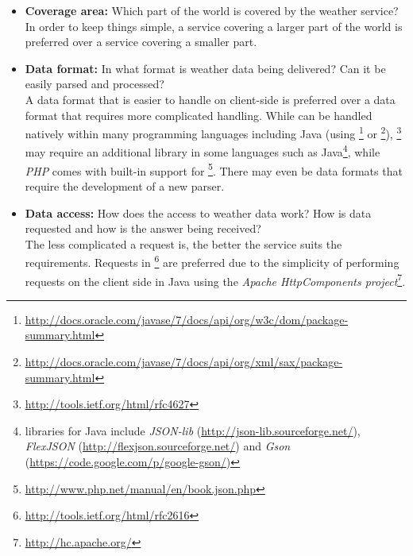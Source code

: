 \begin{itemize}
  \item \textbf{Coverage area:} Which part of the world is covered by the weather service?\\
  In order to keep things simple, a service covering a larger part of the world is preferred over a service covering a smaller part.
  
  \item \textbf{Data format:} In what format is weather data being delivered? Can it be easily parsed and processed?\\
  A data format that is easier to handle on client-side is preferred over a data format that requires more complicated handling. While \cite{XML} can be handled natively within many programming languages including Java (using \footnote{\href{http://docs.oracle.com/javase/7/docs/api/org/w3c/dom/package-summary.html}{http://docs.oracle.com/javase/7/docs/api/org/w3c/dom/package-summary.html}} or \footnote{\href{http://docs.oracle.com/javase/7/docs/api/org/xml/sax/package-summary.html}{http://docs.oracle.com/javase/7/docs/api/org/xml/sax/package-summary.html}}), \footnote{\href{http://tools.ietf.org/html/rfc4627}{http://tools.ietf.org/html/rfc4627}} may require an additional library in some languages such as Java\footnote{ libraries for Java include \emph{JSON-lib} (\href{http://json-lib.sourceforge.net/}{http://json-lib.sourceforge.net/}), \emph{FlexJSON} (\href{http://flexjson.sourceforge.net/}{http://flexjson.sourceforge.net/}) and \emph{Gson}
    (\href{https://code.google.com/p/google-gson/}{https://code.google.com/p/google-gson/})}, while \emph{PHP} comes with built-in support for \footnote{\href{http://www.php.net/manual/en/book.json.php}{http://www.php.net/manual/en/book.json.php}}. There may even be data formats that require the development of a new parser.
  
  \item \textbf{Data access:} How does the access to weather data work? How is data requested and how is the answer being received?\\
  The less complicated a request is, the better the service suits the requirements. Requests in \footnote{\href{http://tools.ietf.org/html/rfc2616}{http://tools.ietf.org/html/rfc2616}} are preferred due to the simplicity of performing requests on the client side in Java using the \emph{Apache HttpComponents project}\footnote{\href{http://hc.apache.org/}{http://hc.apache.org/}}.
  

\end{itemize}
